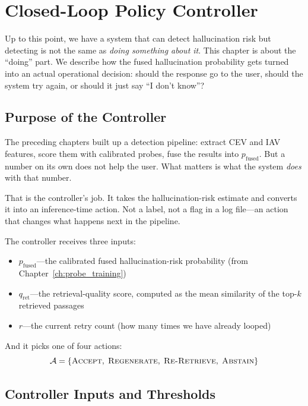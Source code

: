 \chapter{Closed-Loop Policy Controller}
\label{ch:controller}

Up to this point, we have a system that can detect hallucination risk but detecting is not the same as \emph{doing something about it}. This chapter is about the ``doing'' part. We describe how the fused hallucination probability gets turned into an actual operational decision: should the response go to the user, should the system try again, or should it just say ``I don't know''?

\section{Purpose of the Controller}
\label{sec:controller_purpose}

The preceding chapters built up a detection pipeline: extract CEV and IAV features, score them with calibrated probes, fuse the results into $p_{\text{fused}}$. But a number on its own does not help the user. What matters is what the system \emph{does} with that number.

That is the controller's job. It takes the hallucination-risk estimate and converts it into an inference-time action. Not a label, not a flag in a log file—an action that changes what happens next in the pipeline.

The controller receives three inputs:
\begin{itemize}
    \item $p_{\text{fused}}$—the calibrated fused hallucination-risk probability (from Chapter~\ref{ch:probe_training})
    \item $q_{\text{ret}}$—the retrieval-quality score, computed as the mean similarity of the top-$k$ retrieved passages
    \item $r$—the current retry count (how many times we have already looped)
\end{itemize}

And it picks one of four actions:
\[
    \mathcal{A} = \{\textsc{Accept},\; \textsc{Regenerate},\; \textsc{Re-Retrieve},\; \textsc{Abstain}\}
\]

\section{Controller Inputs and Thresholds}
\label{sec:controller_inputs}

